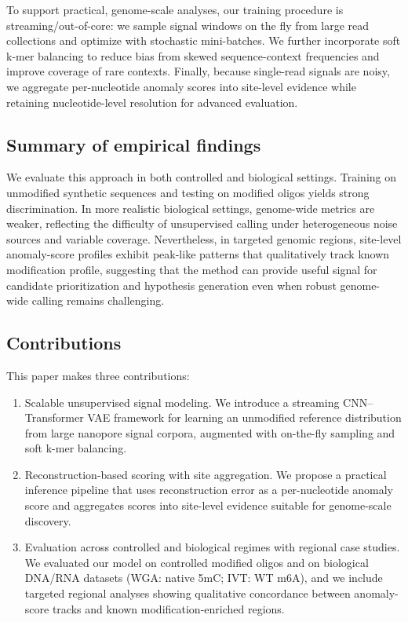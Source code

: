 \documentclass[journal,article,submit,pdftex,moreauthors]{Definitions/mdpi}
\begin{document}
To support practical, genome-scale analyses, our training procedure is streaming/out-of-core: we sample signal windows on the fly from large read collections and optimize with stochastic mini-batches. We further incorporate soft k-mer balancing to reduce bias from skewed sequence-context frequencies and improve coverage of rare contexts. Finally, because single-read signals are noisy, we aggregate per-nucleotide anomaly scores into site-level evidence while retaining nucleotide-level resolution for advanced evaluation.

\subsection{Summary of empirical findings}
We evaluate this approach in both controlled and biological settings. Training on unmodified synthetic sequences and testing on modified oligos yields strong discrimination. In more realistic biological settings, genome-wide metrics are weaker, reflecting the difficulty of unsupervised calling under heterogeneous noise sources and variable coverage. Nevertheless, in targeted genomic regions, site-level anomaly-score profiles exhibit peak-like patterns that qualitatively track known modification profile, suggesting that the method can provide useful signal for candidate prioritization and hypothesis generation even when robust genome-wide calling remains challenging.

\subsection{Contributions}
This paper makes three contributions:
\begin{enumerate}
    \item Scalable unsupervised signal modeling. We introduce a streaming CNN--Transformer VAE framework for learning an unmodified reference distribution from large nanopore signal corpora, augmented with on-the-fly sampling and soft k-mer balancing.
    \item Reconstruction-based scoring with site aggregation. We propose a practical inference pipeline that uses reconstruction error as a per-nucleotide anomaly score and aggregates scores into site-level evidence suitable for genome-scale discovery.
    \item Evaluation across controlled and biological regimes with regional case studies. We evaluated our model on controlled modified oligos and on biological DNA/RNA datasets (WGA: native 5mC; IVT: WT m6A), and we include targeted regional analyses showing qualitative concordance between anomaly-score tracks and known modification-enriched regions.
\end{enumerate}
\end{document}
